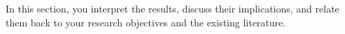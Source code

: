 In this section, you interpret the results, discuss their implications, and relate them back to your research objectives and the existing literature.
